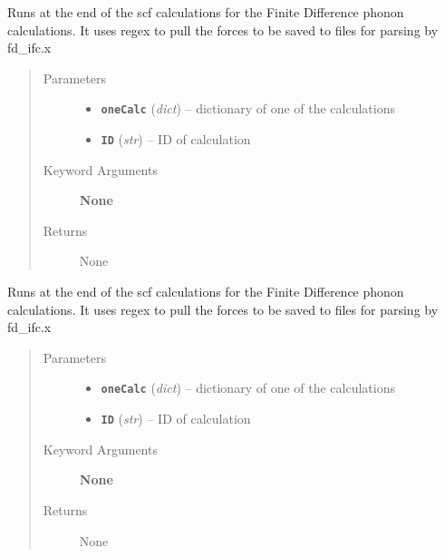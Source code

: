 \documentclass[letterpaper,10pt,english]{sphinxmanual}
\begin{document}

\begin{fulllineitems}
\label{run:run.__pull_forces}
Runs at the end of the scf calculations for the Finite Difference phonon
calculations. It uses regex to pull the forces to be saved to files for
parsing by fd\_ifc.x
\begin{quote}\begin{description}
\item[{Parameters}] \leavevmode\begin{itemize}
\item {} 
\textbf{\texttt{oneCalc}} (\emph{dict}) -- dictionary of one of the calculations

\item {} 
\textbf{\texttt{ID}} (\emph{str}) -- ID of calculation

\end{itemize}

\item[{Keyword Arguments}] \leavevmode
\textbf{None}

\item[{Returns}] \leavevmode
None

\end{description}\end{quote}

\end{fulllineitems}


\begin{fulllineitems}
\label{run:run.__pull_polarization}
Runs at the end of the scf calculations for the Finite Difference phonon
calculations. It uses regex to pull the forces to be saved to files for
parsing by fd\_ifc.x
\begin{quote}\begin{description}
\item[{Parameters}] \leavevmode\begin{itemize}
\item {} 
\textbf{\texttt{oneCalc}} (\emph{dict}) -- dictionary of one of the calculations

\item {} 
\textbf{\texttt{ID}} (\emph{str}) -- ID of calculation

\end{itemize}

\item[{Keyword Arguments}] \leavevmode
\textbf{None}

\item[{Returns}] \leavevmode
None

\end{description}\end{quote}

\end{fulllineitems}
\end{document}
